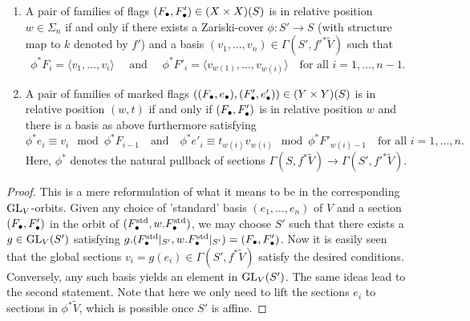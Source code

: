 \documentclass[../main.tex]{subfiles}
\begin{document}
\begin{lem}\label{lem:RelativePositionVecCrit}
  \begin{enumerate}
    \item A pair of families of flags $(F_\bullet, F_\bullet') \in (X \times X)(S)$ is 
      in relative position $w \in \Sigma_n$ if and only if there exists a
      Zariski-cover $ \phi: S' \to S$ (with structure map to $k$ denoted by
      $f'$) and a basis $(v_1, \dots, v_n) \in \Gamma(S', f'^*\tilde V)$ such
      that 
      \begin{equation*}
        \phi^* F_i  = \langle v_1, \dots, v_i \rangle
        \quad \text{ and } \quad 
        \phi^* F'_i  = \langle v_{w(1)}, \dots, v_{w(i)} \rangle 
        \quad \text{for all } i = 1, \dots, n-1.
      \end{equation*}
    \item A pair of families of marked flags $((F_\bullet, e_\bullet), (F_\bullet', e_\bullet'))
      \in (Y \times Y)(S)$
      is in relative position $(w,t)$ if and only if $(F_\bullet, F_\bullet')$ is in relative
      position $w$ and there is a basis as above furthermore satisfying
      \begin{equation*}
        \phi^* e_i \equiv v_i \mod \phi^*F_{i-1} \quad \text{and} \quad
        \phi^*e'_i \equiv t_{w(i)}v_{w(i)} \mod \phi^*F'_{w(i)-1} \quad
        \text{for all } i = 1, \dots, n.
      \end{equation*}
      Here, $\phi^*$ denotes the natural pullback of sections
      $\Gamma(S, f^*\tilde V) \to \Gamma(S', f'^* \tilde V)$.
  \end{enumerate}
\begin{proof}
  This is a mere reformulation of what it means to be in the corresponding
  $\operatorname{GL}_V$-orbits. Given any choice 
  of 'standard' basis $(e_1, \dots, e_n)$ of $V$ and a section $(F_\bullet, F_\bullet')$
  in the orbit of $(F_\bullet^{\mathrm{std}}, w.F_\bullet^{\mathrm{std}})$, we
  may choose $S'$ such that there exists a $g \in \operatorname{GL}_V(S')$ 
  satisfying $g.(F_\bullet^{\mathrm{std}}|_{S'}, w.F_\bullet^{\mathrm{std}}|_{S'}) = (F_\bullet, F_\bullet')$.
  Now it is easily seen that the global sections $v_i = g(e_i) \in \Gamma(S',
  f^*\tilde V)$ satisfy the desired conditions. Conversely, any such basis
  yields an element in $\operatorname{GL}_V(S')$. The same ideas lead to the second statement.
  Note that here we only need to lift the sections $e_i$ to sections 
  in $\phi^* \tilde V$, which is possible once $S'$ is affine. 
\end{proof}
\end{lem}
\end{document}
